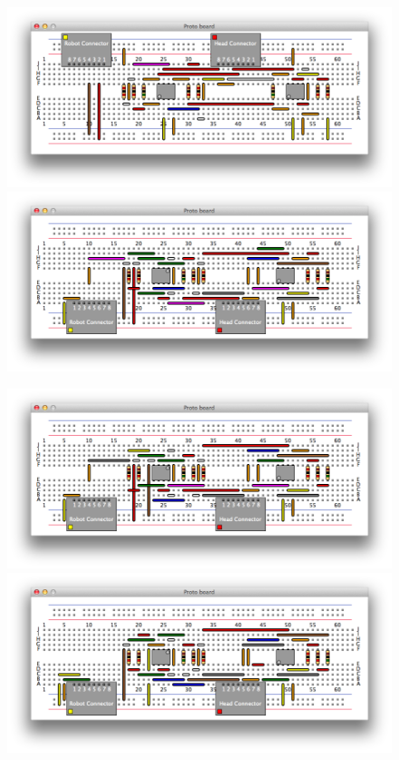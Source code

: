 \begin{figure}[H]
\begin{center}
\includegraphics[width=\textwidth]{Images/exemplar_all_pairs.png}
\includegraphics[width=\textwidth]{Images/exemplar_per_node_increasing.png}
\end{center}
\end{figure}
\begin{figure}[H]
\begin{center}
\includegraphics[width=\textwidth]{Images/exemplar_per_node_decreasing.png}
\includegraphics[width=\textwidth]{Images/exemplar_per_pair_increasing.png}
\end{center}
\end{figure}
